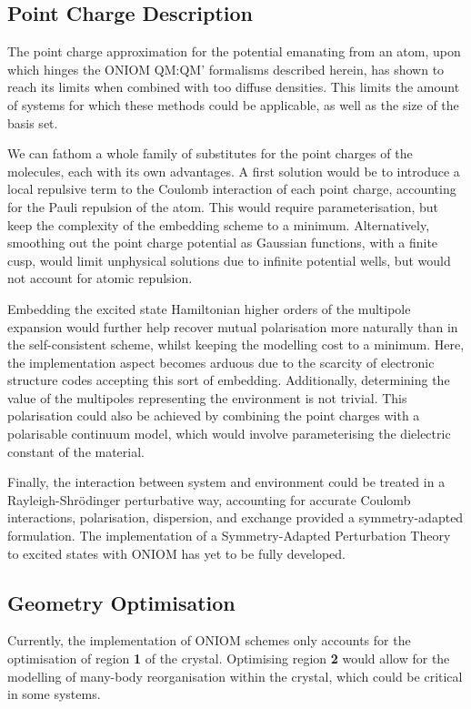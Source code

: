 \subsection*{Point Charge Description}
The point charge approximation for the potential emanating from an atom, upon which hinges the ONIOM QM:QM' formalisms described herein, has shown to reach its limits when combined with too diffuse densities. This limits the amount of systems for which these methods could be applicable, as well as the size of the basis set.

We can fathom a whole family of substitutes for the point charges of the molecules, each with its own advantages. A first solution would be to introduce a local repulsive term to the Coulomb interaction of each point charge, accounting for the Pauli repulsion of the atom. This would require parameterisation, but keep the complexity of the embedding scheme to a minimum. Alternatively, smoothing out the point charge potential as Gaussian functions, with a finite cusp, would limit unphysical solutions due to infinite potential wells, but would not account for atomic repulsion.

Embedding the excited state Hamiltonian higher orders of the multipole expansion would further help recover mutual polarisation more naturally than in the self-consistent scheme, whilst keeping the modelling cost to a minimum. Here, the implementation aspect becomes arduous due to the scarcity of electronic structure codes accepting this sort of embedding. Additionally, determining the value of the multipoles representing the environment is not trivial. This polarisation could also be achieved by combining the point charges with a polarisable continuum model,\cite{Loco2016} which would involve parameterising the dielectric constant of the material.

Finally, the interaction between system and environment could be treated in a Rayleigh-Shr\"odinger perturbative way, accounting for accurate Coulomb interactions, polarisation, dispersion, and exchange provided a symmetry-adapted formulation.\cite{Jeziorski1994,Jansen2014} The implementation of a Symmetry-Adapted Perturbation Theory to excited states with ONIOM has yet to be fully developed.

\subsection*{Geometry Optimisation}
Currently, the implementation of ONIOM schemes only accounts for the optimisation of region \textbf{1} of the crystal. Optimising region \textbf{2} would allow for the modelling of many-body reorganisation within the crystal, which could be critical in some systems.

